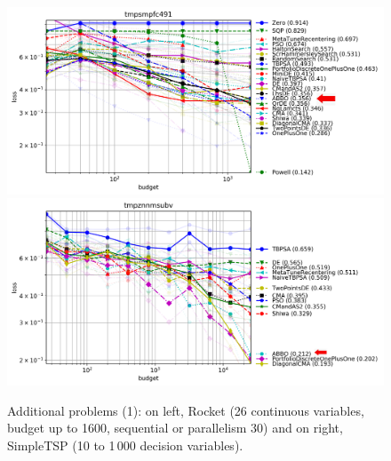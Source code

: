 \begin{figure}[t]
    \centering
\includegraphics[trim={0 0 0 21 },clip,width=.48\linewidth]{sections/appendix/h220benchmarks/benchmark/xp_rocket.png}
\includegraphics[trim={0 0 0 21},clip,width=.48\linewidth]{sections/appendix/h220benchmarks/benchmark/xp_simpletsp.png}

	\caption{{Additional  problems (1): on left, Rocket (26 continuous variables, budget up to 1600, sequential or parallelism 30) and on right, SimpleTSP (10 to 1\,000 decision variables).}}
	\label{figaddrwbis}
\end{figure}

